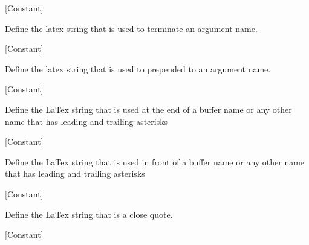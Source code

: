 \vspace{1em}
\noindent
{}
\usebox{\funcname}
 \hfill [Constant]

\begin{doc-string}
Define the latex string that is used to terminate an argument name.
\end{doc-string}

\vspace{1em}
\noindent
{}
\usebox{\funcname}
 \hfill [Constant]

\begin{doc-string}
Define the latex string that is used to prepended to an argument name.
\end{doc-string}

\vspace{1em}
\noindent
{}
\usebox{\funcname}
 \hfill [Constant]

\begin{doc-string}
Define the LaTex string that is used at the end of a buffer name or
any other name that has leading and trailing asterisks
\end{doc-string}

\vspace{1em}
\noindent
{}
\usebox{\funcname}
 \hfill [Constant]

\begin{doc-string}
Define the LaTex string that is used in front of a buffer name or
any other name that has leading and trailing asterisks
\end{doc-string}

\vspace{1em}
\noindent
{}
\usebox{\funcname}
 \hfill [Constant]

\begin{doc-string}
Define the LaTex string that is a close quote.
\end{doc-string}

\vspace{1em}
\noindent
{}
\usebox{\funcname}
 \hfill [Constant]

